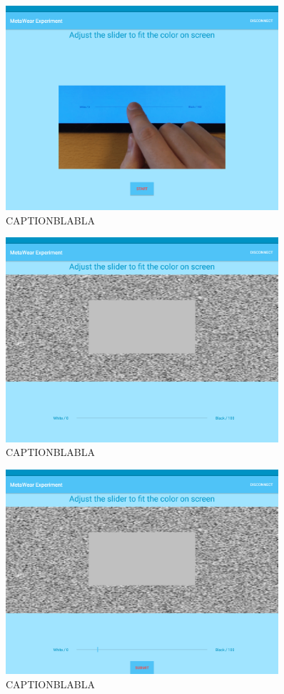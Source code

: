\begin{figure}[h!]
\centering
\includegraphics[width=0.9\textwidth]{figures/tablet_screen6.png}
\caption{CAPTIONBLABLA}
\label{appendix_app_screen_6}
\end{figure}

\begin{figure}[h!]
\centering
\includegraphics[width=0.9\textwidth]{figures/tablet_screen7.png}
\caption{CAPTIONBLABLA}
\label{appendix_app_screen_7}
\end{figure}

\begin{figure}[h!]
\centering
\includegraphics[width=0.9\textwidth]{figures/tablet_screen8.png}
\caption{CAPTIONBLABLA}
\label{appendix_app_screen_8}
\end{figure}

